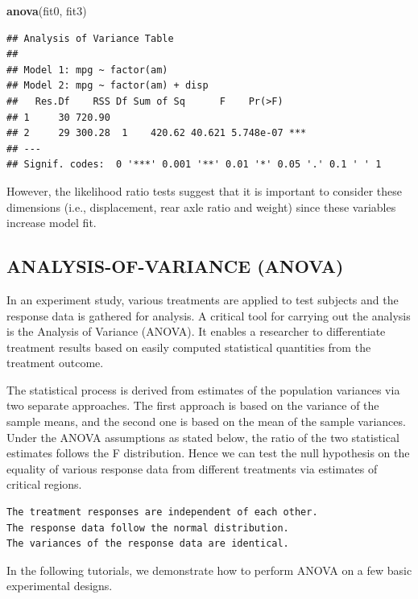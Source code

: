 \documentclass[]{article}
\newenvironment{Shaded}{\begin{snugshade}}{\end{snugshade}}
\newcommand{\KeywordTok}[1]{\textcolor[rgb]{0.13,0.29,0.53}{\textbf{{#1}}}}
\newcommand{\NormalTok}[1]{{#1}}
\numberwithin{equation}{section}
\begin{document}
\begin{Shaded}
\begin{Highlighting}[]
\KeywordTok{anova}\NormalTok{(fit0, fit3)}
\end{Highlighting}
\end{Shaded}

\begin{verbatim}
## Analysis of Variance Table
## 
## Model 1: mpg ~ factor(am)
## Model 2: mpg ~ factor(am) + disp
##   Res.Df    RSS Df Sum of Sq      F    Pr(>F)    
## 1     30 720.90                                  
## 2     29 300.28  1    420.62 40.621 5.748e-07 ***
## ---
## Signif. codes:  0 '***' 0.001 '**' 0.01 '*' 0.05 '.' 0.1 ' ' 1
\end{verbatim}

However, the likelihood ratio tests suggest that it is important to
consider these dimensions (i.e., displacement, rear axle ratio and
weight) since these variables increase model fit.

\subsection{ANALYSIS-OF-VARIANCE
(ANOVA)}\label{analysis-of-variance-anova}

In an experiment study, various treatments are applied to test subjects
and the response data is gathered for analysis. A critical tool for
carrying out the analysis is the Analysis of Variance (ANOVA). It
enables a researcher to differentiate treatment results based on easily
computed statistical quantities from the treatment outcome.

The statistical process is derived from estimates of the population
variances via two separate approaches. The first approach is based on
the variance of the sample means, and the second one is based on the
mean of the sample variances. Under the ANOVA assumptions as stated
below, the ratio of the two statistical estimates follows the F
distribution. Hence we can test the null hypothesis on the equality of
various response data from different treatments via estimates of
critical regions.

\begin{verbatim}
The treatment responses are independent of each other.
The response data follow the normal distribution.
The variances of the response data are identical.
\end{verbatim}

In the following tutorials, we demonstrate how to perform ANOVA on a few
basic experimental designs.
\end{document}
